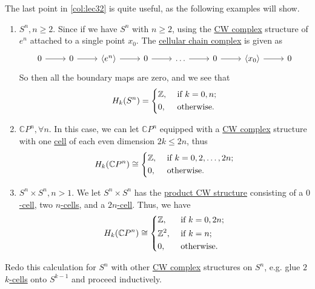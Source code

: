 \begin{eg}
	The last point in \autoref{col:lec32} is quite useful, as the following examples will show.
	\begin{enumerate}[(1)]
		\item \(S^n, n \geq 2\). Since if we have \(S^n\) with \(n \geq 2\), using the \hyperref[def:CW-Complex]{CW complex} structure of
		      \(e^n\) attached to a single point \(x_0\). The \hyperref[def:cellular-chain-complex]{cellular chain complex} is given as
		      \[
			      \begin{tikzcd}
				      0 & 0 & {\left<e^n\right>} & 0 & \ldots & 0 & {\left<x_0\right>} & 0
				      \arrow[from=1-1, to=1-2]
				      \arrow[from=1-2, to=1-3]
				      \arrow[from=1-3, to=1-4]
				      \arrow[from=1-4, to=1-5]
				      \arrow[from=1-5, to=1-6]
				      \arrow[from=1-6, to=1-7]
				      \arrow[from=1-7, to=1-8]
			      \end{tikzcd}
		      \]
		      So then all the boundary maps are zero, and we see that
		      \[
			      H_k(S^n) = \begin{dcases}
				      \mathbb{Z}, & \text{ if } k=0, n ; \\
				      0,          & \text{ otherwise}.
			      \end{dcases}
		      \]
		\item \(\mathbb{C} P^n, \forall n\). In this case, we can let \(\mathbb{C} P^n\) equipped with a
		      \hyperref[def:CW-Complex]{CW complex} structure with one \hyperref[def:cell]{cell} of each even dimension \(2k \leq 2n\), thus
		      \[
			      H_{k}(\mathbb{C} P^n) \cong \begin{dcases}
				      \mathbb{Z}, & \text{ if } k = 0, 2, \ldots , 2n; \\
				      0,          & \text{ otherwise}.
			      \end{dcases}
		      \]
		\item \(S^n \times S^n, n > 1\). We let \(S^n \times S^n\) has the \hyperref[CW-complex-product]{product CW structure} consisting
		      of a \hyperref[def:cell]{\(0\)-cell}, two \hyperref[def:cell]{\(n\)-cells}, and a \hyperref[def:cell]{\(2n\)-cell}.
		      Thus, we have
		      \[
			      H_{k}(\mathbb{C} P^n) \cong \begin{dcases}
				      \mathbb{Z},      & \text{ if } k = 0, 2n; \\
				      \mathbb{Z}^{2} , & \text{ if } k = n;     \\
				      0,               & \text{ otherwise}.
			      \end{dcases}
		      \]
	\end{enumerate}
\end{eg}

\begin{exercise}
	Redo this calculation for \(S^n\) with other \hyperref[def:CW-Complex]{CW complex} structures on \(S^n\), e.g. glue \(2\) \hyperref[def:cell]{\(k\)-cells} onto \(S^{k - 1}\) and proceed inductively.
\end{exercise}